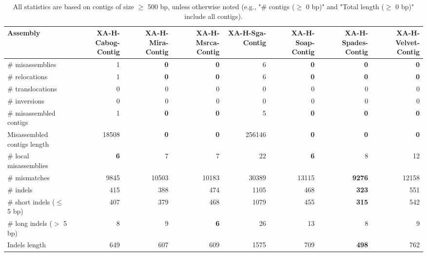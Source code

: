 \documentclass[12pt,a4paper]{article}
\begin{document}
\begin{table}[ht]
\begin{center}
\caption{All statistics are based on contigs of size $\geq$ 500 bp, unless otherwise noted (e.g., "\# contigs ($\geq$ 0 bp)" and "Total length ($\geq$ 0 bp)" include all contigs).}
\begin{tabular}{|l*{7}{|r}|}
\hline
Assembly & XA-H-Cabog-Contig & XA-H-Mira-Contig & XA-H-Msrca-Contig & XA-H-Sga-Contig & XA-H-Soap-Contig & XA-H-Spades-Contig & XA-H-Velvet-Contig \\ \hline
\# misassemblies & 1 & {\bf 0} & {\bf 0} & 6 & {\bf 0} & {\bf 0} & {\bf 0} \\ \hline
\hspace{5mm}\# relocations & 1 & {\bf 0} & {\bf 0} & 6 & {\bf 0} & {\bf 0} & {\bf 0} \\ \hline
\hspace{5mm}\# translocations & 0 & 0 & 0 & 0 & 0 & 0 & 0 \\ \hline
\hspace{5mm}\# inversions & 0 & 0 & 0 & 0 & 0 & 0 & 0 \\ \hline
\# misassembled contigs & 1 & {\bf 0} & {\bf 0} & 5 & {\bf 0} & {\bf 0} & {\bf 0} \\ \hline
Misassembled contigs length & 18508 & {\bf 0} & {\bf 0} & 256146 & {\bf 0} & {\bf 0} & {\bf 0} \\ \hline
\# local misassemblies & {\bf 6} & 7 & 7 & 22 & {\bf 6} & 8 & 12 \\ \hline
\# mismatches & 9845 & 10503 & 10183 & 30389 & 13115 & {\bf 9276} & 12158 \\ \hline
\# indels & 415 & 388 & 474 & 1105 & 468 & {\bf 323} & 551 \\ \hline
\hspace{5mm}\# short indels ($\leq$ 5 bp) & 407 & 379 & 468 & 1079 & 455 & {\bf 315} & 542 \\ \hline
\hspace{5mm}\# long indels ($>$ 5 bp) & 8 & 9 & {\bf 6} & 26 & 13 & 8 & 9 \\ \hline
Indels length & 649 & 607 & 609 & 1575 & 709 & {\bf 498} & 762 \\ \hline
\end{tabular}
\end{center}
\end{table}
\end{document}
